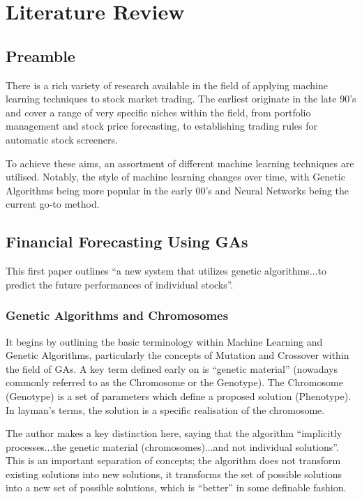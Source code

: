 \section{Literature Review}
\subsection{Preamble}
There is a rich variety of research available in the field of applying machine learning techniques to stock market trading. The earliest originate in the late 90's and cover a range of very specific niches within the field, from portfolio management and stock price forecasting, to establishing trading rules for automatic stock screeners. \newline

To achieve these aims, an assortment of different machine learning techniques are utilised. Notably, the style of machine learning changes over time, with Genetic Algorithms being more popular in the early 00's and Neural Networks being the current go-to method.

\subsection{Financial Forecasting Using GAs \cite{mahfoudMani}}
This first paper outlines ``a new system that utilizes genetic algorithms...to predict the future performances of individual stocks''.

\subsubsection{Genetic Algorithms and Chromosomes}

It begins by outlining the basic terminology within Machine Learning and Genetic Algorithms, particularly the concepts of Mutation and Crossover within the field of GAs. A key term defined early on is ``genetic material'' (nowadays commonly referred to as the Chromosome or the Genotype). The Chromosome (Genotype) is a set of parameters which define a proposed solution (Phenotype). In layman's terms, the solution is a specific realisation of the chromosome. \newline

The author makes a key distinction here, saying that the algorithm ``implicitly processes...the genetic material (chromosomes)...and not individual solutions''. This is an important separation of concepts; the algorithm does not transform existing solutions into new solutions, it transforms the set of possible solutions into a new set of possible solutions, which is ``better'' in some definable fashion. \newline

